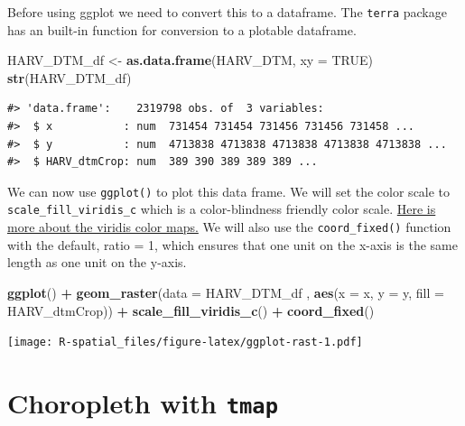 \documentclass[
]{book}
\newenvironment{Shaded}{\begin{snugshade}}{\end{snugshade}}
\newcommand{\AttributeTok}[1]{\textcolor[rgb]{0.13,0.29,0.53}{#1}}
\newcommand{\ConstantTok}[1]{\textcolor[rgb]{0.56,0.35,0.01}{#1}}
\newcommand{\FunctionTok}[1]{\textcolor[rgb]{0.13,0.29,0.53}{\textbf{#1}}}
\newcommand{\NormalTok}[1]{#1}
\newcommand{\OtherTok}[1]{\textcolor[rgb]{0.56,0.35,0.01}{#1}}
\newcommand{\SpecialCharTok}[1]{\textcolor[rgb]{0.81,0.36,0.00}{\textbf{#1}}}
\begin{document}
Before using ggplot we need to convert this to a dataframe. The \texttt{terra} package has an built-in function for conversion to a plotable dataframe.

\begin{Shaded}
\begin{Highlighting}[]
\NormalTok{HARV\_DTM\_df }\OtherTok{\textless{}{-}} \FunctionTok{as.data.frame}\NormalTok{(HARV\_DTM, }\AttributeTok{xy =} \ConstantTok{TRUE}\NormalTok{)}
\FunctionTok{str}\NormalTok{(HARV\_DTM\_df)}
\end{Highlighting}
\end{Shaded}

\begin{verbatim}
#> 'data.frame':    2319798 obs. of  3 variables:
#>  $ x           : num  731454 731454 731456 731456 731458 ...
#>  $ y           : num  4713838 4713838 4713838 4713838 4713838 ...
#>  $ HARV_dtmCrop: num  389 390 389 389 389 ...
\end{verbatim}

We can now use \texttt{ggplot()} to plot this data frame. We will set the color scale to \texttt{scale\_fill\_viridis\_c} which is a color-blindness friendly color scale. \href{https://cran.r-project.org/web/packages/viridis/vignettes/intro-to-viridis.html}{Here is more about the viridis color maps.} We will also use the \texttt{coord\_fixed()} function with the default, ratio = 1, which ensures that one unit on the x-axis is the same length as one unit on the y-axis.

\begin{Shaded}
\begin{Highlighting}[]
\FunctionTok{ggplot}\NormalTok{() }\SpecialCharTok{+}
    \FunctionTok{geom\_raster}\NormalTok{(}\AttributeTok{data =}\NormalTok{ HARV\_DTM\_df , }\FunctionTok{aes}\NormalTok{(}\AttributeTok{x =}\NormalTok{ x, }\AttributeTok{y =}\NormalTok{ y, }\AttributeTok{fill =}\NormalTok{ HARV\_dtmCrop)) }\SpecialCharTok{+}
    \FunctionTok{scale\_fill\_viridis\_c}\NormalTok{() }\SpecialCharTok{+}
    \FunctionTok{coord\_fixed}\NormalTok{()}
\end{Highlighting}
\end{Shaded}

\texttt{[image: R-spatial\_files/figure-latex/ggplot-rast-1.pdf]}

\hypertarget{choropleth-with-tmap}{%
\section{\texorpdfstring{Choropleth with \texttt{tmap}}{Choropleth with tmap}}\label{choropleth-with-tmap}}
\end{document}
